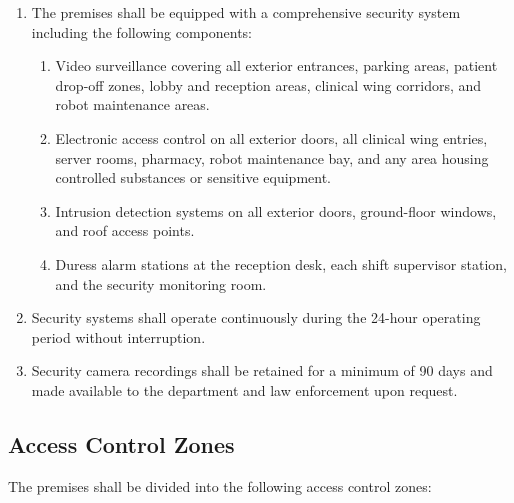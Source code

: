 \documentclass[11pt,letterpaper]{article}
\begin{document}
\begin{enumerate}[label=(\alph*)]
\item The premises shall be equipped with a comprehensive security system
  including the following components:
  \begin{enumerate}[label=(\arabic*)]
  \item Video surveillance covering all exterior entrances, parking areas,
    patient drop-off zones, lobby and reception areas, clinical wing corridors,
    and robot maintenance areas.
  \item Electronic access control on all exterior doors, all clinical wing
    entries, server rooms, pharmacy, robot maintenance bay, and any area
    housing controlled substances or sensitive equipment.
  \item Intrusion detection systems on all exterior doors, ground-floor windows,
    and roof access points.
  \item Duress alarm stations at the reception desk, each shift supervisor
    station, and the security monitoring room.
  \end{enumerate}

\item Security systems shall operate continuously during the 24-hour operating
  period without interruption.

\item Security camera recordings shall be retained for a minimum of 90 days
  and made available to the department and law enforcement upon request.
\end{enumerate}

\subsection{Access Control Zones}

The premises shall be divided into the following access control zones:
\end{document}
